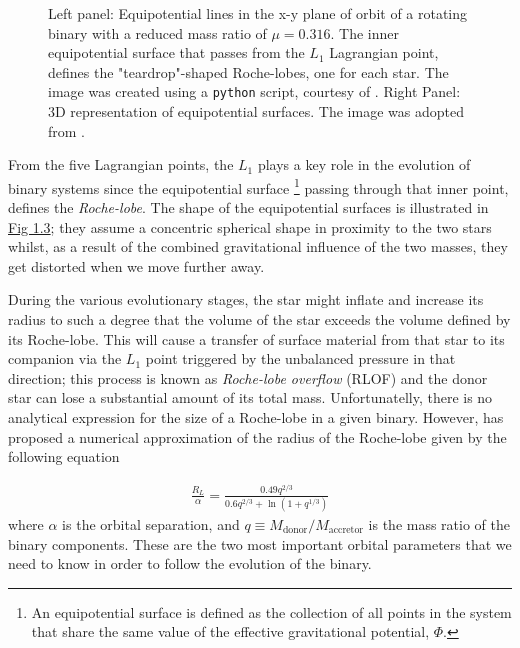 \documentclass[../../main/thesis_msc.tex]{subfiles}
\begin{document}
\begin{figure}[h]
\begin{subfigure}[h]{0.45\textwidth}
   					 \end{subfigure}
   					 \caption{Left panel: Equipotential lines in the x-y plane of orbit of a rotating binary with a reduced mass ratio of $\mu = 0.316$. The inner equipotential surface that passes from the $L_1$ Lagrangian point, defines the "teardrop"-shaped Roche-lobes, one for each star. The image was created using a \texttt{python} script, courtesy of \cite{Zingale}. Right Panel: 3D representation of equipotential surfaces. The image was adopted from \cite{Sluijs}. }
   					 \label{fig:eq_sur}
				\end{figure}
				
				From the five Lagrangian points, the $L_1$ plays a key role in the evolution of binary systems since the equipotential surface \footnote{An equipotential surface is defined as the collection of all points in the system that share the same value of the effective gravitational potential, $\Phi$.} passing through that inner point, defines the \emph{Roche-lobe}. The shape of the equipotential surfaces is illustrated in \hyperref[fig:eq_sur]{Fig 1.3}; they assume a concentric spherical shape in proximity to the two stars whilst, as a result of the combined gravitational influence of the two masses, they get distorted when we move further away.
				
				During the various evolutionary stages, the star might inflate and increase its radius to such a degree that the volume of the star exceeds the volume defined by its Roche-lobe. This will cause a transfer of surface material from that star to its companion via the $L_1$ point triggered by the unbalanced pressure in that direction; this process is known as \emph{Roche-lobe overflow} (RLOF) and the donor star can lose a substantial amount of its total mass. Unfortunatelly, there is no analytical expression for the size of a Roche-lobe in a given binary. However, \cite{Eggleton1983} has proposed a numerical approximation of the radius of the Roche-lobe given by the following equation
				
				\begin{eqnarray}
					\label{eq:rl_radius}
					\frac{R_L}{\alpha} = \frac{0.49 q^{2/3}}{0.6 q^{2/3} + \ln(1 + q^{1/3})}
				\end{eqnarray}				 
				where $\alpha$ is the orbital separation, and $q \equiv M_{\text{donor}} / M_{\text{accretor}}$ is the mass ratio of the binary components. These are the two most important orbital parameters that we need to know in order to follow the evolution of the binary.
				
\end{document}
